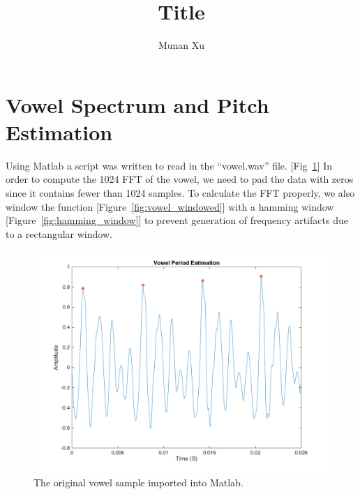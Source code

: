 \documentclass{article}
\title{Title}
\author{Munan Xu}
\begin{document}
\section{Vowel Spectrum and Pitch Estimation}
\FloatBarrier
Using Matlab a script was written to read in the ``vowel.wav'' file. [Fig~\ref{fig:vowel_period}] In order to compute the 1024 FFT of the vowel, we need to pad the data with zeros since it contains fewer than 1024 samples. To calculate the FFT properly, we also window the function [Figure~\ref{fig:vowel_windowed}] with a hamming window [Figure~\ref{fig:hamming_window}] to prevent generation of frequency artifacts due to a rectangular window.
\begin{figure}[h]
  \centering
    \includegraphics[width=.4\textheight]{vowel_period.png}
  \caption{The original vowel sample imported into Matlab.}
  \label{fig:vowel_period}
\end{figure}
\end{document}
